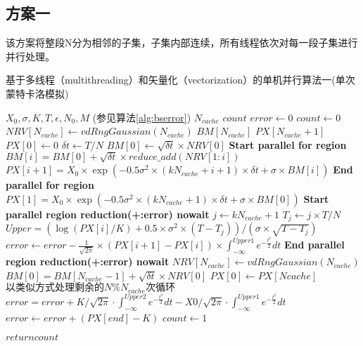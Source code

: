\subsection{方案一}
该方案将整段N分为相邻的子集，子集内部连续，所有线程依次对每一段子集进行并行处理。
\begin{algorithm}
  \caption{基于多线程（multithreading）和矢量化（vectorization）的单机并行算法一(单次蒙特卡洛模拟)}
  \label{alg:omp1}
  \begin{algorithmic}[1]
    \Require $X_0, \sigma, K, T, \epsilon, N_0, M$ (参见算法\ref{alg:bserror})
    \Require $N_{cache}$ 
    \Ensure $count$
    \State $error \gets 0$
    \State $count \gets 0$
    \State $NRV[N_{cache}] \gets vdRngGaussian(N_{cache})$ 
    \State $BM[N_{cache}]$ 
    \State $PX[N_{cache}+1]$ 
    \State $PX[0] \gets 0$
    \State $\delta t \gets T/N$
    \State $BM[0] \gets \sqrt{\delta t} \times NRV[0]$
    \State \textbf{Start parallel for region} 
    \State $BM[i] = BM[0] + \sqrt{\delta t}\times reduce\_add(NRV[1:i])$ 
    \State $PX[i+1] = X_0 \times \exp(-0.5 \sigma^2 \times (kN_{cache}+i+1) \times \delta t + \sigma \times BM[i])$
    \EndFor
    \State \textbf{End parallel for region}
    \State $PX[1] = X_0 \times \exp(-0.5 \sigma^2 \times (kN_{cache}+1) \times \delta t + \sigma \times BM[0])$
    \State \textbf{Start parallel region reduction(+:error) nowait}
    \State $j \gets kN_{cache}+1$
    \State $T_j \gets {j \times T}/{N}$
    \State $Upper = (\log(PX[i]/K)+0.5\times \sigma^2 \times (T-T_j))/(\sigma \times \sqrt{T-T_j})$
    \State $error \gets error - \frac{1}{\sqrt{2\pi}}\times (PX[i+1]-PX[i])\times \int_{-\infty}^{Upper1}e^{-\frac{t^2}{2}}dt$
    \EndFor
    \State \textbf{End parallel region reduction(+:error) nowait}
    \State $NRV[N_{cache}] \gets vdRngGaussian(N_{cache})$ 
    \State $BM[0] = BM[N_{cache}-1] + \sqrt{\delta t}\times NRV[0]$
    \State $PX[0] \gets PX[Ncache]$
    \EndFor
    \State $以类似方式处理剩余的N\%N_{cache}次循环$
    \State $error = error + K/\sqrt{2\pi} \cdot \int_{-\infty}^{Upper2}e^{-\frac{t^2}{2}}dt -X0/\sqrt{2\pi}\cdot \int_{-\infty}^{Upper1}e^{-\frac{t^2}{2}}dt$
    \State $error \gets error + (PX[end]-K)$
    \EndIf
    \State $count \gets 1$
    \EndIf
    
    \State $return count$
    
    \EndProcedure
  \end{algorithmic}
\end{algorithm}
